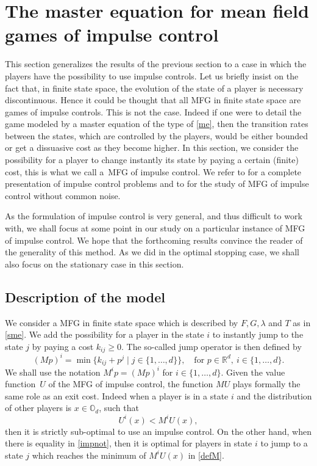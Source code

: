 \documentclass[10pt]{amsart}
\let\sep\mid
\theoremstyle{definition}
\begin{document}
\section{The master equation for mean field games of impulse control}\label{sec:4}
This section generalizes the results of the previous section to a case in which the players have the possibility to use impulse controls. Let us briefly insist on the fact that, in finite state space, the evolution of the state of a player is necessary discontinuous. Hence it could be thought that all MFG in finite state space are games of impulse controls. This is not the case. Indeed if one were to detail the game modeled by a master equation of the type of \eqref{me}, then the transition rates between the states, which are controlled by the players, would be either bounded or get a dissuasive cost as they become higher. In this section, we consider the possibility for a player to change instantly its state by paying a certain (finite) cost, this is what we call a~MFG of impulse control. We refer to \cite{bensoussan1984impulse} for a complete presentation of impulse control problems and to \cite{bertucci2020fokker} for the study of MFG of impulse control without common noise.

As the formulation of impulse control is very general, and thus difficult to work with, we shall focus at some point in our study on a particular instance of MFG of impulse control. We hope that the forthcoming results convince the reader of the generality of this method. As we did in the optimal stopping case, we shall also focus on the stationary case in this section.

\subsection{Description of the model}
We consider a MFG in finite state space which is described by $F,G,\lambda$ and $T$ as in \eqref{sme}. We add the possibility for a player in the state $i$ to instantly jump to the state $j$ by paying a cost $k_{ij}\geq 0$. The so-called jump operator is then defined by
\begin{equation}\label{defM}
(Mp)^i = \min \{ k_{ij}+p^j \sep j \in \{1,\dots,d\}\}, \quad\text{for } p \in \mathbb{R}^d,\ i \in \{1,\dots,d\}.
\end{equation}
We shall use the notation $M^i p = (Mp)^i$ for $i \in \{1,\dots,d\}$. Given the value function~$U$ of the MFG of impulse control, the function $MU$ plays formally the same role as an exit cost. Indeed when a player is in a state $i$ and the distribution of other players is $x \in \mathbb{O}_d$, such that
\begin{equation}\label{impnot}
U^i(x) < M^iU(x),
\end{equation} then it is strictly sub-optimal to use an impulse control. On the other hand, when there is equality in \eqref{impnot}, then it is optimal for players in state $i$ to jump to a state $j$ which reaches the minimum of $M^iU(x)$ in \eqref{defM}.
\end{document}
